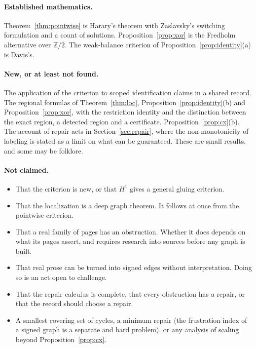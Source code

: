 \documentclass[11pt]{article}
\theoremstyle{plain}
\theoremstyle{definition}
\theoremstyle{remark}
\begin{document}
\paragraph{Established mathematics.} Theorem~\ref{thm:pointwise} is Harary's theorem with Zaslavsky's switching formulation and a count of solutions. Proposition~\ref{prop:xor} is the Fredholm alternative over $\mathbb Z/2$. The weak-balance criterion of Proposition~\ref{prop:identity}(a) is Davis's.

\paragraph{New, or at least not found.} The application of the criterion to scoped identification claims in a shared record. The regional formulas of Theorem~\ref{thm:loc}, Proposition~\ref{prop:identity}(b) and Proposition~\ref{prop:xor}, with the restriction identity and the distinction between the exact region, a detected region and a certificate. Proposition~\ref{prop:cx}(b). The account of repair acts in Section~\ref{sec:repair}, where the non-monotonicity of labeling is stated as a limit on what can be guaranteed. These are small results, and some may be folklore.

\paragraph{Not claimed.}
\begin{itemize}[nosep]
\item That the criterion is new, or that $H^1$ gives a general gluing criterion.
\item That the localization is a deep graph theorem. It follows at once from the pointwise criterion.
\item That a real family of pages has an obstruction. Whether it does depends on what its pages assert, and requires research into sources before any graph is built.
\item That real prose can be turned into signed edges without interpretation. Doing so is an act open to challenge.
\item That the repair calculus is complete, that every obstruction has a repair, or that the record should choose a repair.
\item A smallest covering set of cycles, a minimum repair (the frustration index of a signed graph is a separate and hard problem), or any analysis of scaling beyond Proposition~\ref{prop:cx}.
\end{itemize}
\end{document}
